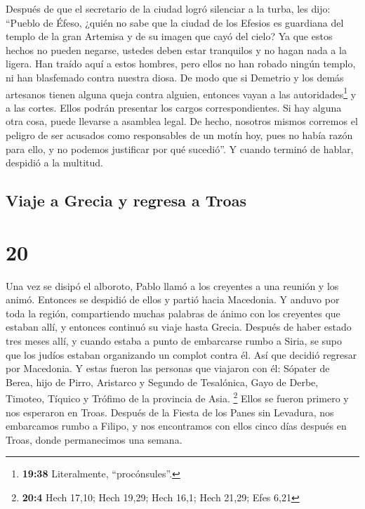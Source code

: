  Después de que el secretario de la ciudad logró
silenciar a la turba, les dijo: ``Pueblo de Éfeso, ¿quién no sabe que la
ciudad de los Efesios es guardiana del templo de la gran Artemisa y de
su imagen que cayó del cielo?  Ya que estos hechos no
pueden negarse, ustedes deben estar tranquilos y no hagan nada a la
ligera.  Han traído aquí a estos hombres, pero ellos no
han robado ningún templo, ni han blasfemado contra nuestra diosa.
 De modo que si Demetrio y los demás artesanos tienen
alguna queja contra alguien, entonces vayan a las autoridades\footnote{\textbf{19:38}
  Literalmente, ``procónsules''.} y a las cortes. Ellos podrán presentar
los cargos correspondientes.  Si hay alguna otra cosa,
puede llevarse a asamblea legal.  De hecho, nosotros
mismos corremos el peligro de ser acusados como responsables de un motín
hoy, pues no había razón para ello, y no podemos justificar por qué
sucedió''.  Y cuando terminó de hablar, despidió a la
multitud.

\hypertarget{viaje-a-grecia-y-regresa-a-troas}{%
\subsection{Viaje a Grecia y regresa a
Troas}\label{viaje-a-grecia-y-regresa-a-troas}}

\hypertarget{section-19}{%
\section{20}\label{section-19}}

 Una vez se disipó el alboroto, Pablo llamó a los
creyentes a una reunión y los animó. Entonces se despidió de ellos y
partió hacia Macedonia.  Y anduvo por toda la región,
compartiendo muchas palabras de ánimo con los creyentes que estaban
allí, y entonces continuó su viaje hasta Grecia.  Después
de haber estado tres meses allí, y cuando estaba a punto de embarcarse
rumbo a Siria, se supo que los judíos estaban organizando un complot
contra él. Así que decidió regresar por Macedonia.  Y
estas fueron las personas que viajaron con él: Sópater de Berea, hijo de
Pirro, Aristarco y Segundo de Tesalónica, Gayo de Derbe, Timoteo,
Tíquico y Trófimo de la provincia de Asia. \footnote{\textbf{20:4} Hech
  17,10; Hech 19,29; Hech 16,1; Hech 21,29; Efes 6,21} 
Ellos se fueron primero y nos esperaron en Troas.  Después
de la Fiesta de los Panes sin Levadura, nos embarcamos rumbo a Filipo, y
nos encontramos con ellos cinco días después en Troas, donde
permanecimos una semana.

